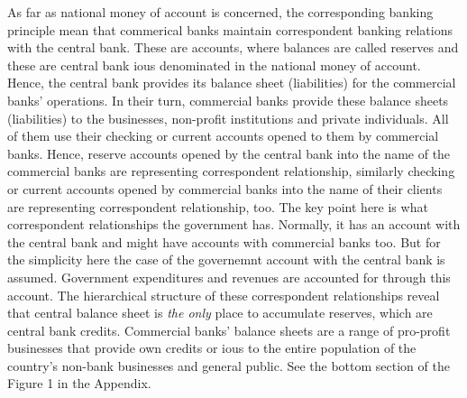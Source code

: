 As far as national money of account is concerned, the corresponding
banking principle mean that commerical banks maintain correspondent
banking relations with the central bank. These are accounts, where
balances are called reserves and these are central bank \acp{iou} denominated
in the national money of account. Hence, the central bank provides
its balance sheet (liabilities) for the commercial banks' operations. In
their turn, commercial banks provide these balance sheets (liabilities)
to the businesses, non-profit institutions and private individuals. All
of them use their checking or current accounts opened to them by
commercial banks. Hence, reserve accounts opened by the central bank
into the name of the commercial banks are representing correspondent
relationship, similarly checking or current accounts opened by
commercial banks into the name of their clients are representing
correspondent relationship, too. The key point here is what
correspondent relationships the government has. Normally, it has an
account with the central bank and might have accounts with commercial
banks too. But for the simplicity here the case of the governemnt
account with the central bank is assumed. Government expenditures and
revenues are accounted for through this account. The hierarchical
structure of these correspondent relationships reveal that central
balance sheet is \textit{the only} place to accumulate reserves, which are
central bank credits. Commercial banks' balance sheets are a range of
pro-profit businesses that provide own credits or \acp{iou} to the entire
population of the country's non-bank businesses and general public. See
the bottom section of the Figure 1 in the Appendix.

